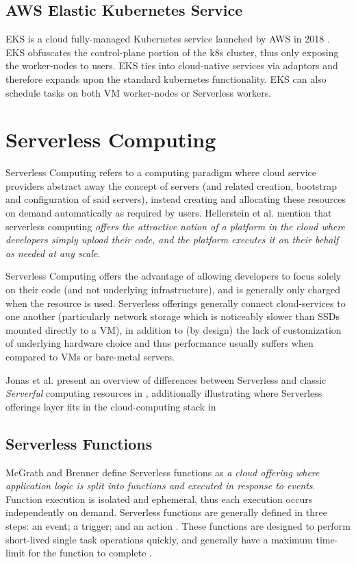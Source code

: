 \section{AWS Elastic Kubernetes Service}
EKS is a cloud fully-managed Kubernetes service launched by AWS in 2018 \cite{eks}. 
EKS obfuscates the control-plane portion of the k8s cluster, thus only exposing the worker-nodes to users.
EKS ties into cloud-native services via adaptors and therefore expands upon the standard kubernetes functionality.
EKS can also schedule tasks on both VM worker-nodes or Serverless workers\cite{hansen_2022}. 

\chapter{Serverless Computing}

Serverless Computing refers to a computing paradigm where cloud service providers abstract away the concept of servers (and related creation, bootstrap and configuration of said servers),
instead creating and allocating these resources on demand automatically as required by users. Hellerstein et al. mention that serverless computing 
\textit{offers the attractive notion of a platform in the cloud where developers simply upload their code, and the platform executes it on their behalf as needed at any scale}\cite{hellerstein2018serverless}.

Serverless Computing offers the advantage of allowing developers to focus solely on their code (and not underlying infrastructure), and is generally only charged when the resource is used\cite{jonas2019cloud}.
Serverless offerings generally connect cloud-services to one another (particularly network storage which is noticeably slower than SSDs mounted directly to a VM), 
in addition to (by design) the lack of customization of underlying hardware choice and thus performance usually suffers when compared to VMs or bare-metal servers\cite{hellerstein2018serverlessdisadvantages}.

Jonas et al. present an overview of differences between Serverless and classic \emph{Serverful} computing resources in \cite[Table 2]{jonas2019cloud}, 
additionally illustrating where Serverless offerings layer fits in the cloud-computing stack in \cite[Figure 1]{jonas2019cloud}

\section{Serverless Functions}
McGrath and Brenner define Serverless functions as \textit{a cloud offering where application logic is split into functions and
executed in response to events}\cite{mcgrath2017serverless}. 
Function execution is isolated and ephemeral, thus each execution occurs independently on demand.
Serverless functions are generally defined in three steps: an event; a trigger; and an action \cite{baldini2016cloud}. 
These functions are designed to perform short-lived single task operations quickly, and generally have a maximum time-limit for the function to complete \cite{hellerstein2018serverlessdisadvantages}.


